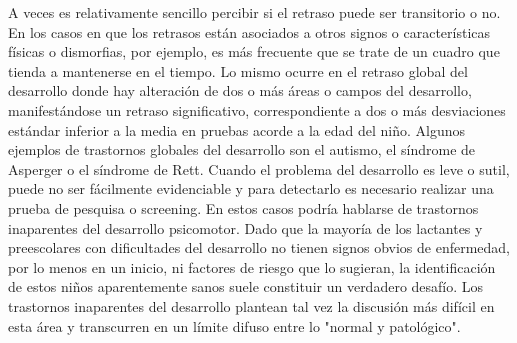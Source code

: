     A veces es relativamente sencillo percibir si el retraso puede ser transitorio o no. En los casos en que los retrasos están asociados a otros signos o características físicas o dismorfias, por ejemplo, es más frecuente que se trate de un cuadro que tienda a mantenerse en el tiempo. Lo mismo ocurre en el retraso global del desarrollo donde hay alteración de dos o más áreas o campos del desarrollo, manifestándose un retraso significativo, correspondiente a dos o más desviaciones estándar inferior a la media en pruebas acorde a la edad del niño. Algunos ejemplos de trastornos globales del desarrollo son el autismo, el síndrome de Asperger o el síndrome de Rett. Cuando el problema del desarrollo es leve o sutil, puede no ser fácilmente evidenciable y para detectarlo es necesario realizar una prueba de pesquisa o screening. En estos casos podría hablarse de trastornos inaparentes del desarrollo psicomotor. Dado que la mayoría de los lactantes y preescolares con dificultades del desarrollo no tienen signos obvios de enfermedad, por lo menos en un inicio, ni factores de riesgo que lo sugieran, la identificación de estos niños aparentemente sanos suele constituir un verdadero desafío. Los trastornos inaparentes del desarrollo plantean tal vez la discusión más difícil en esta área y transcurren en un límite difuso entre lo "normal y patológico".
